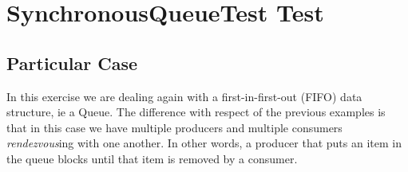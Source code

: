 \section{\textbf{SynchronousQueueTest Test}}
\subsection{Particular Case}
\par
In this exercise we are dealing again with a first-in-first-out (FIFO) data
structure, ie a Queue. The difference with respect of the previous examples is
that in this case we have multiple producers and multiple consumers
\textit{rendezvous}ing with one another. In other words, a producer that puts
an item in the queue blocks until that item is removed by a consumer.
\par
